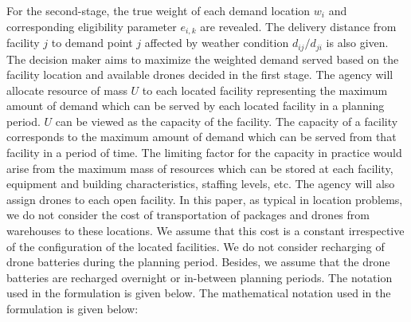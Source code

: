 \documentclass[preprint,review,11pt,authoryear]{elsarticle}
\begin{document}
For the second-stage, the true weight of each demand location $w_i$ and corresponding eligibility parameter $e_{i,k}$ are revealed. The delivery distance from facility $j$ to demand point $j$ affected by weather condition $d_{ij}/d_{ji}$ is also given. The decision maker aims to maximize the weighted demand served based on the facility location and available drones decided in the first stage. The agency will allocate resource of mass $U$ to each located facility representing the maximum amount of demand which can be served by each located facility in a planning period. $U$ can be viewed as the capacity of the facility. The capacity of a facility corresponds to the maximum amount of demand which can be served from that facility in a period of time. The limiting factor for the capacity in practice would arise from the maximum mass of resources which can be stored at each facility, equipment and building characteristics, staffing levels, etc. The agency will also assign drones to each open facility. In this paper, as typical in location problems, we do not consider the cost of transportation of packages and drones from warehouses to these locations. We assume that this cost is a constant irrespective of the configuration of the located facilities. We do not consider recharging of drone batteries during the planning period. Besides, we assume that the drone batteries are recharged overnight or in-between planning periods. The notation used in the formulation is given below. The mathematical notation used in the formulation is given below:
\end{document}
